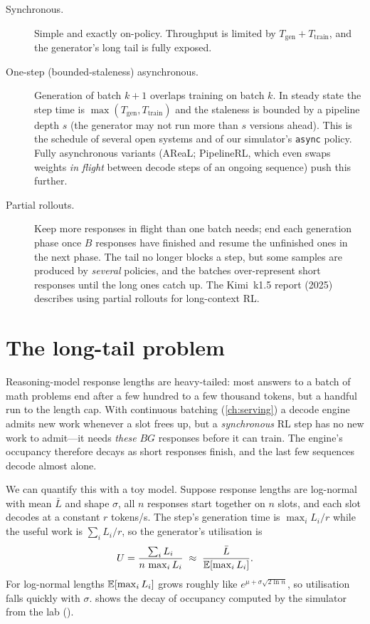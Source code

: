 \begin{description}
\item[Synchronous.] Simple and exactly on-policy. Throughput is limited by
$T_{\text{gen}}+T_{\text{train}}$, and the generator's long tail is fully exposed.
\item[One-step (bounded-staleness) asynchronous.] Generation of batch $k+1$ overlaps training
on batch $k$. In steady state the step time is $\max(T_{\text{gen}},T_{\text{train}})$ and the
staleness is bounded by a pipeline depth $s$ (the generator may not run more than $s$ versions
ahead). This is the schedule of several open systems and of our simulator's \texttt{async}
policy. Fully asynchronous variants (AReaL; PipelineRL, which even swaps weights
\emph{in flight} between decode steps of an ongoing sequence) push this further.
\item[Partial rollouts.] Keep more responses in flight than one batch needs; end each
generation phase once $B$ responses have finished and resume the unfinished ones in the next
phase. The tail no longer blocks a step, but some samples are produced by \emph{several}
policies, and the batches over-represent short responses until the long ones catch up. The
Kimi~k1.5 report (2025) describes using partial rollouts for long-context RL.
\end{description}

\section{The long-tail problem}\label{sec:rlsys:tail}

Reasoning-model response lengths are heavy-tailed: most answers to a batch of math problems
end after a few hundred to a few thousand tokens, but a handful run to the length cap. With
continuous batching (\cref{ch:serving}) a decode engine admits new work whenever a slot frees
up, but a \emph{synchronous} RL step has no new work to admit---it needs \emph{these}
$BG$ responses before it can train. The engine's occupancy therefore decays as short
responses finish, and the last few sequences decode almost alone.

We can quantify this with a toy model. Suppose response lengths are log-normal with mean
$\bar L$ and shape $\sigma$, all $n$ responses start together on $n$ slots, and each slot
decodes at a constant $r$ tokens/s. The step's generation time is $\max_i L_i/r$ while the
useful work is $\sum_i L_i/r$, so the generator's utilisation is
\begin{equation}
U = \frac{\sum_i L_i}{n\,\max_i L_i} \;\approx\; \frac{\bar L}{\mathbb{E}[\max_i L_i]}.
\end{equation}
For log-normal lengths $\mathbb{E}[\max_i L_i]$ grows roughly like $e^{\mu + \sigma\sqrt{2\ln n}}$, so
utilisation falls quickly with $\sigma$.  shows the decay of
occupancy computed by the simulator from the lab ().

